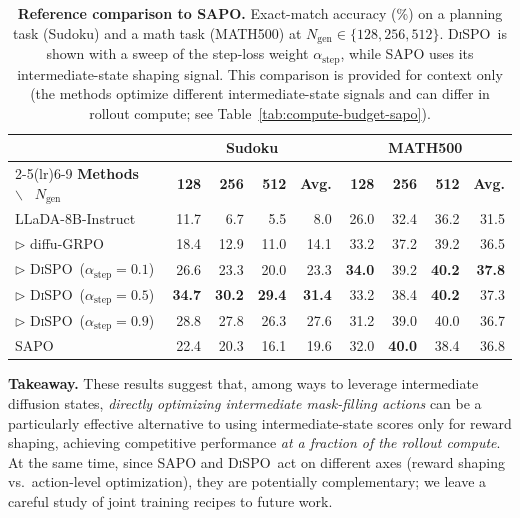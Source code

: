 \documentclass{article}
\newcommand{\method}{{\textsc{DiSPO}}}
\theoremstyle{plain}
\theoremstyle{definition}
\theoremstyle{remark}
\begin{document}
\begin{table}[h]
\centering
\caption{\textbf{Reference comparison to SAPO.}
Exact-match accuracy (\%) on a planning task (Sudoku) and a math task (MATH500) at $N_{\text{gen}}\in\{128,256,512\}$.
\method\ is shown with a sweep of the step-loss weight $\alpha_{\text{step}}$, while SAPO uses its intermediate-state shaping signal.
This comparison is provided for context only (the methods optimize different intermediate-state signals and can differ in rollout compute; see Table~\ref{tab:compute-budget-sapo}).}
\label{tab:sapo-sweep}
\begin{tabular}{lr@{\,\,\,\,\,}r@{\,\,\,\,\,}r@{\,\,\,\,\,}rr@{\,\,\,\,\,}r@{\,\,\,\,\,}r@{\,\,\,\,\,}r}
\toprule
& \multicolumn{4}{c}{\textbf{Sudoku}} & \multicolumn{4}{c}{\textbf{MATH500}} \\
\cmidrule(lr){2-5}\cmidrule(lr){6-9}
\textbf{Methods} ~$\backslash$~ \textbf{$N_\text{gen}$} & \textbf{128} & \textbf{256} & \textbf{512} & \textbf{Avg.} & \textbf{128} & \textbf{256} & \textbf{512} & \textbf{Avg.} \\
\midrule
LLaDA-8B-Instruct & 11.7 & 6.7 & 5.5 & 8.0 & 26.0 & 32.4 & 36.2 & 31.5 \\
\quad $\triangleright$ diffu-GRPO & 18.4 & 12.9 & 11.0 & 14.1 & 33.2 & 37.2 & 39.2 & 36.5 \\
\rowcolor{gray!10}
\quad $\triangleright$ \method\ ($\alpha_{\text{step}}=0.1$) & 26.6 & 23.3 & 20.0 & 23.3 & \textbf{34.0} & {39.2} & \textbf{40.2} & \textbf{37.8} \\
\rowcolor{gray!10}
\quad $\triangleright$ \method\ ($\alpha_{\text{step}}=0.5$) & \textbf{34.7} & \textbf{30.2} & \textbf{29.4} & \textbf{31.4} & 33.2 & 38.4 & \textbf{40.2} & 37.3 \\
\rowcolor{gray!12}
\quad $\triangleright$ \method\ ($\alpha_{\text{step}}=0.9$) & 28.8 & 27.8 & 26.3 & 27.6 & 31.2 & 39.0 & 40.0 & 36.7 \\
\midrule
SAPO~\citep{sapo} & 22.4 & 20.3 & 16.1 & 19.6 & 32.0 & \textbf{40.0} & 38.4 & 36.8 \\
\bottomrule
\end{tabular}
\end{table}


\textbf{Takeaway.}
These results suggest that, among ways to leverage intermediate diffusion states, \emph{directly optimizing intermediate mask-filling actions} can be a particularly effective alternative to using intermediate-state scores only for reward shaping, achieving competitive performance \emph{at a fraction of the rollout compute}.
At the same time, since SAPO and \method\ act on different axes (reward shaping vs.\ action-level optimization), they are potentially complementary; we leave a careful study of joint training recipes to future work.
\end{document}
